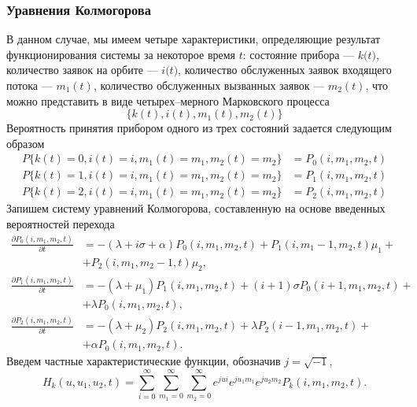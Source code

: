\subsubsection{Уравнения Колмогорова}
В данном случае, мы имеем четыре характеристики, определяющие результат функционирования системы за некоторое время $t$: состояние прибора --- $\textit{k(t)}$, количество заявок на орбите --- $\textit{i(t)}$, количество обслуженных заявок входящего потока --- $m_{1}(t)$, количество обслуженных вызванных заявок --- $m_{2}(t)$,  что можно представить в виде четырех--мерного Марковского процесса
\begin{equation*}
	\{k(t),i(t),m_{1}(t),m_{2}(t)\}
\end{equation*}
Вероятность принятия прибором одного из трех состояний задается следующим образом
\begin{equation*}
	\begin{split}
		P\{k(t)=0,i(t)=i,m_{1}(t)=m_{1},m_{2}(t)=m_{2}\} &=P_{0}(i,m_{1},m_{2},t)\\
		P\{k(t)=1,i(t)=i,m_{1}(t)=m_{1},m_{2}(t)=m_{2}\} &=P_{1}(i,m_{1},m_{2},t)\\
		P\{k(t)=2,i(t)=i,m_{1}(t)=m_{1},m_{2}(t)=m_{2}\} &=P_{2}(i,m_{1},m_{2},t)
	\end{split}
\end{equation*}
Запишем систему уравнений Колмогорова, составленную на основе введенных вероятностей перехода
\begin{equation} \label{kolmogorov_equations_twodim}
	\begin{split}
		\frac{{\partial P_{0}(i,m_{1},m_{2},t)}}{{\partial t}} &= -(\lambda + i\sigma + \alpha)P_{0}(i,m_{1},m_{2},t) + P_{1}(i,m_{1}-1,m_{2},t)\mu_{1} +\\  &+ P_{2}(i,m_{1},m_{2}-1,t)\mu_{2} ,
		\\
		\frac{{\partial P_{1}(i,m_{1},m_{2},t)}}{{\partial t}} &= -(\lambda + \mu_{1})P_{1}(i,m_{1},m_{2},t) + (i+1)\sigma P_{0}(i+1,m_{1},m_{2},t) +\\ &+ \lambda  P_{0}(i,m_{1},m_{2},t),
		\\
		\frac{{\partial P_{2}(i,m_{1},m_{2},t)}}{{\partial t}} &= -(\lambda + \mu_{2})P_{2}(i,m_{1},m_{2},t) + \lambda P_{2}(i-1,m_{1},m_{2},t)  +\\ &+ \alpha  P_{0}(i,m_{1},m_{2},t).
	\end{split}
\end{equation}	
Введем частные характеристические функции, обозначив $j=\sqrt{-1}$,
\begin{equation*}
	H_{k}(u,u_{1},u_{2},t) = \sum_{i=0}^{\infty}
	\sum_{m_{1}=0}^{\infty}
	\sum_{m_{2}=0}^{\infty}  
	e^{jui}e^{ju_{1}m_{1}}e^{ju_{2}m_{2}} P_{k}(i,m_{1},m_{2},t).
\end{equation*}
